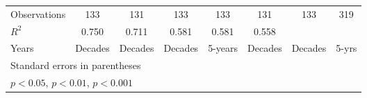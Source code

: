 \begin{table}[htbp]
\begin{tabular}{l*{7}{c}}
\midrule
Observations    &      133         &      131         &      133         &      133         &      131         &      133         &      319         \\
\(R^{2}\)       &    0.750         &    0.711         &    0.581         &    0.581         &    0.558         &                  &                  \\
Years           &  Decades         &  Decades         &  Decades         &  5-years         &  Decades         &  Decades         &    5-yrs         \\
\bottomrule
\multicolumn{8}{l}{\footnotesize Standard errors in parentheses}\\
\multicolumn{8}{l}{\footnotesize \sym{*} \(p<0.05\), \sym{**} \(p<0.01\), \sym{***} \(p<0.001\)}\\
\end{tabular}
\end{table}
